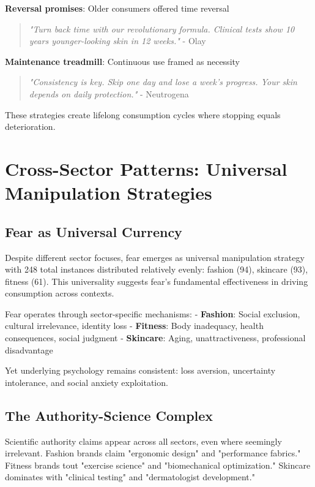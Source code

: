 \textbf{Reversal promises}: Older consumers offered time reversal
\begin{quote}
\textit{"Turn back time with our revolutionary formula. Clinical tests show 10 years younger-looking skin in 12 weeks."} - Olay
\end{quote}

\textbf{Maintenance treadmill}: Continuous use framed as necessity
\begin{quote}
\textit{"Consistency is key. Skip one day and lose a week's progress. Your skin depends on daily protection."} - Neutrogena
\end{quote}

These strategies create lifelong consumption cycles where stopping equals deterioration.

\section{Cross-Sector Patterns: Universal Manipulation Strategies}
\label{sec:cross_sector}

\subsection{Fear as Universal Currency}

Despite different sector focuses, fear emerges as universal manipulation strategy with 248 total instances distributed relatively evenly: fashion (94), skincare (93), fitness (61). This universality suggests fear's fundamental effectiveness in driving consumption across contexts.

Fear operates through sector-specific mechanisms:
- \textbf{Fashion}: Social exclusion, cultural irrelevance, identity loss
- \textbf{Fitness}: Body inadequacy, health consequences, social judgment
- \textbf{Skincare}: Aging, unattractiveness, professional disadvantage

Yet underlying psychology remains consistent: loss aversion, uncertainty intolerance, and social anxiety exploitation.

\subsection{The Authority-Science Complex}

Scientific authority claims appear across all sectors, even where seemingly irrelevant. Fashion brands claim "ergonomic design" and "performance fabrics." Fitness brands tout "exercise science" and "biomechanical optimization." Skincare dominates with "clinical testing" and "dermatologist development."

